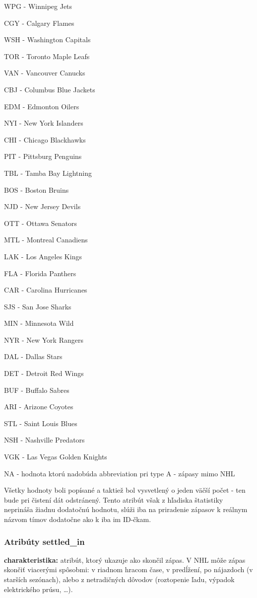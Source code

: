 \documentclass[
]{article}
\begin{document}
WPG - Winnipeg Jets

CGY - Calgary Flames

WSH - Washington Capitals

TOR - Toronto Maple Leafs

VAN - Vancouver Canucks

CBJ - Columbus Blue Jackets

EDM - Edmonton Oilers

NYI - New York Islanders

CHI - Chicago Blackhawks

PIT - Pittsburg Penguins

TBL - Tamba Bay Lightning

BOS - Boston Bruins

NJD - New Jersey Devils

OTT - Ottawa Senators

MTL - Montreal Canadiens

LAK - Los Angeles Kings

FLA - Florida Panthers

CAR - Carolina Hurricanes

SJS - San Jose Sharks

MIN - Minnesota Wild

NYR - New York Rangers

DAL - Dallas Stars

DET - Detroit Red Wings

BUF - Buffalo Sabres

ARI - Arizone Coyotes

STL - Saint Louis Blues

NSH - Nashville Predators

VGK - Las Vegas Golden Knights

NA - hodnota ktorú nadobúda abbreviation pri type A - zápasy mimo NHL

Všetky hodnoty boli popísané a taktiež bol vysvetlený o jeden väčší
počet - ten bude pri čistení dát odstránený. Tento atribút však z
hľadiska štatistiky neprináša žiadnu dodatočnú hodnotu, slúži iba na
priradenie zápasov k reálnym názvom tímov dodatočne ako k iba im
ID-čkam.

\hypertarget{atribuxfaty-settled_in}{%
\subsubsection{Atribúty settled\_in}\label{atribuxfaty-settled_in}}

\textbf{charakteristika:} atribút, ktorý ukazuje ako skončil zápas. V
NHL môže zápas skončiť viacerými spôsobmi: v riadnom hracom čase, v
predĺžení, po nájazdoch (v starších sezónach), alebo z netradičných
dôvodov (roztopenie ľadu, výpadok elektrického prúsu, \ldots).
\end{document}
